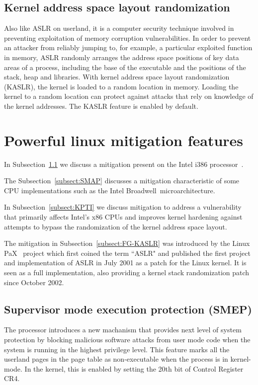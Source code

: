 \documentclass{masterthesis}
\newcommand{\refToSubSection}[1]{Subsection~\ref{subsect:#1}\xspace}
\begin{document}
\subsection{Kernel address space layout randomization}
\label{subsect:KASLR}
Also like ASLR on userland, it is a computer security technique involved in preventing exploitation of memory corruption vulnerabilities. In order to prevent an attacker from reliably jumping to, for example, a particular exploited function in memory, ASLR randomly arranges the address space positions of key data areas of a process, including the base of the executable and the positions of the stack, heap and libraries.
With kernel address space layout randomization (KASLR), the kernel is loaded to a random location in memory.
Loading the kernel to a random location can protect against attacks that rely on knowledge of the kernel addresses.
The KASLR feature is enabled by default.

\section{Powerful linux mitigation features}
\label{sect:powerful mitigation}
In \refToSubSection{SMEP} we discuss a mitigation present on the Intel i386 processor~\cite{inteli386}.

The \refToSubSection{SMAP} discusses a mitigation characteristic of some CPU implementations such as the Intel Broadwell~\cite{nalamalpu2015broadwell}microarchitecture.

In \refToSubSection{KPTI} we discuss mitigation to address a vulnerability that primarily affects Intel's x86 CPUs and improves kernel hardening against attempts to bypass the randomization of the kernel address space layout.

The mitigation in \refToSubSection{FG-KASLR} was introduced by the Linux PaX~\cite{nalamalpu2015broadwell} project which first coined the term ``ASLR" and published the first project and implementation of ASLR in July 2001 as a patch for the Linux kernel. It is seen as a full implementation, also providing a kernel stack randomization patch since October 2002.
\subsection{Supervisor mode execution protection (SMEP)}
\label{subsect:SMEP}
The processor introduces a new machanism that provides next level of system protection by blocking malicious software attacks from user mode code when the system is running in the highest privilege level.
This feature marks all the userland pages in the page table as non-executable when the process is in kernel-mode. In the kernel, this is enabled by setting the 20th bit of Control Register CR4.
\end{document}
